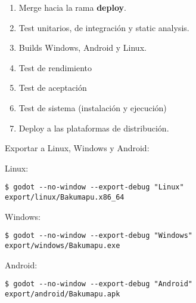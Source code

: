 \begin{enumerate}
  \item Merge hacia la rama \textbf{deploy}.
  \item Test unitarios, de integración y static analysis.
  \item Builds Windows, Android y Linux.
  \item Test de rendimiento
  \item Test de aceptación
  \item Test de sistema (instalación y ejecución)
  \item Deploy a las plataformas de distribución.
\end{enumerate}

Exportar a Linux, Windows y Android:

Linux:
\begin{lstlisting}
$ godot --no-window --export-debug "Linux" export/linux/Bakumapu.x86_64
\end{lstlisting}

Windows:
\begin{lstlisting}
$ godot --no-window --export-debug "Windows" export/windows/Bakumapu.exe
\end{lstlisting}

Android:
\begin{lstlisting}
$ godot --no-window --export-debug "Android" export/android/Bakumapu.apk
\end{lstlisting}